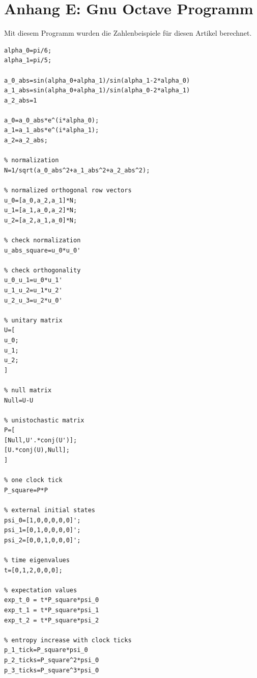 \documentclass[12pt]{article}
\begin{document}
\section{Anhang E: Gnu Octave Programm}
Mit diesem Programm wurden die Zahlenbeispiele für diesen Artikel berechnet.
\begin{verbatim}
alpha_0=pi/6;
alpha_1=pi/5;

a_0_abs=sin(alpha_0+alpha_1)/sin(alpha_1-2*alpha_0)
a_1_abs=sin(alpha_0+alpha_1)/sin(alpha_0-2*alpha_1)
a_2_abs=1

a_0=a_0_abs*e^(i*alpha_0);
a_1=a_1_abs*e^(i*alpha_1);
a_2=a_2_abs;

% normalization
N=1/sqrt(a_0_abs^2+a_1_abs^2+a_2_abs^2);

% normalized orthogonal row vectors
u_0=[a_0,a_2,a_1]*N;
u_1=[a_1,a_0,a_2]*N;
u_2=[a_2,a_1,a_0]*N;

% check normalization
u_abs_square=u_0*u_0'

% check orthogonality
u_0_u_1=u_0*u_1'
u_1_u_2=u_1*u_2'
u_2_u_3=u_2*u_0'

% unitary matrix
U=[
u_0;
u_1;
u_2;
]

% null matrix
Null=U-U

% unistochastic matrix
P=[
[Null,U'.*conj(U')];
[U.*conj(U),Null];
]

% one clock tick
P_square=P*P

% external initial states
psi_0=[1,0,0,0,0,0]';
psi_1=[0,1,0,0,0,0]';
psi_2=[0,0,1,0,0,0]';

% time eigenvalues
t=[0,1,2,0,0,0];

% expectation values
exp_t_0 = t*P_square*psi_0
exp_t_1 = t*P_square*psi_1
exp_t_2 = t*P_square*psi_2

% entropy increase with clock ticks
p_1_tick=P_square*psi_0
p_2_ticks=P_square^2*psi_0
p_3_ticks=P_square^3*psi_0
\end{verbatim}
\end{document}
